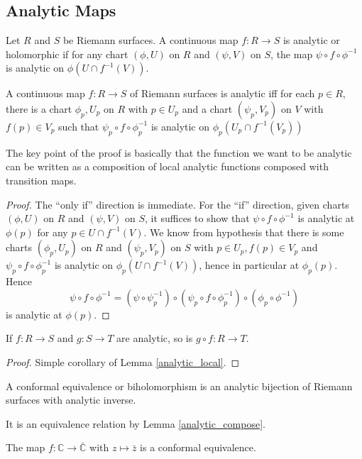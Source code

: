 \subsection{Analytic Maps}
\begin{definition}
    Let $R$ and $S$ be Riemann surfaces.
    A continuous map $f:R\to S$ is analytic or holomorphic if for any chart $(\phi,U)$ on $R$ and $(\psi,V)$ on $S$, the map $\psi\circ f\circ \phi^{-1}$ is analytic on $\phi(U\cap f^{-1}(V))$.
\end{definition}
\begin{lemma}\label{analytic_local}
    A continuous map $f:R\to S$ of Riemann surfaces is analytic iff for each $p\in R$, there is a chart $\phi_p,U_p$ on $R$ with $p\in U_p$ and a chart $(\psi_p,V_p)$ on $V$ with $f(p)\in V_p$ such that $\psi_p\circ f\circ \phi_p^{-1}$ is analytic on $\phi_p(U_p\cap f^{-1}(V_p))$
\end{lemma}
The key point of the proof is basically that the function we want to be analytic can be written as a composition of local analytic functions composed with transition maps.
\begin{proof}
    The ``only if'' direction is immediate.
    For the ``if'' direction, given charts $(\phi,U)$ on $R$ and $(\psi,V)$ on $S$, it suffices to show that $\psi\circ f\circ\phi^{-1}$ is analytic at $\phi(p)$ for any $p\in U\cap f^{-1}(V)$.
    We know from hypothesis that there is some charts $(\phi_p,U_p)$ on $R$ and $(\psi_p,V_p)$ on $S$ with $p\in U_p,f(p)\in V_p$ and $\psi_p\circ f\circ\phi_p^{-1}$ is analytic on $\phi_p(U\cap f^{-1}(V))$, hence in particular at $\phi_p(p)$.
    Hence
    $$\psi\circ f\circ\phi^{-1}=(\psi\circ\psi_p^{-1})\circ(\psi_p\circ f\circ\phi_p^{-1})\circ (\phi_p\circ\phi^{-1})$$
    is analytic at $\phi(p)$.
\end{proof}
\begin{lemma}\label{analytic_compose}
    If $f:R\to S$ and $g:S\to T$ are analytic, so is $g\circ f:R\to T$.
\end{lemma}
\begin{proof}
    Simple corollary of Lemma \ref{analytic_local}.
\end{proof}
\begin{definition}
    A conformal equivalence or biholomorphism is an analytic bijection of Riemann surfaces with analytic inverse.
\end{definition}
It is an equivalence relation by Lemma \ref{analytic_compose}.
\begin{example}
    The map $f:\mathbb C\to\bar{\mathbb C}$ with $z\mapsto \bar{z}$ is a conformal equivalence.
\end{example}